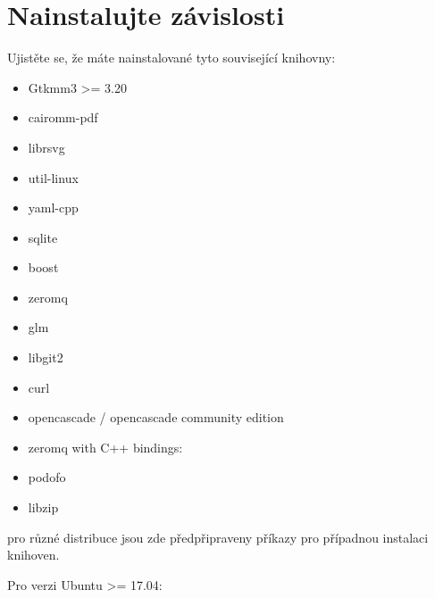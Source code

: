 \documentclass[letterpaper,10pt,czech]{sphinxmanual}
\begin{document}
\section{Nainstalujte závislosti}
\label{\detokenize{build-linux:nainstalujte-zavislosti}}
Ujistěte se, že máte nainstalované tyto související knihovny:
\begin{itemize}
\item {} 
Gtkmm3 \textgreater{}= 3.20

\item {} 
cairomm-pdf

\item {} 
librsvg

\item {} 
util-linux

\item {} 
yaml-cpp

\item {} 
sqlite

\item {} 
boost

\item {} 
zeromq

\item {} 
glm

\item {} 
libgit2

\item {} 
curl

\item {} 
opencascade / opencascade community edition

\item {} 
zeromq with C++ bindings: 

\item {} 
podofo

\item {} 
libzip

\end{itemize}

pro různé distribuce jsou zde předpřipraveny příkazy pro případnou instalaci knihoven.

Pro verzi Ubuntu \textgreater{}= 17.04:
\end{document}
